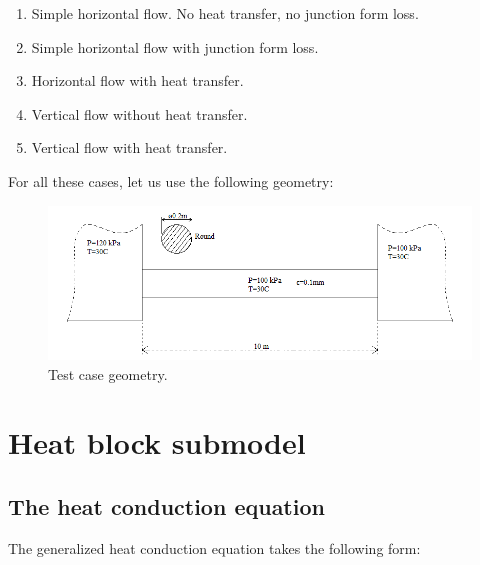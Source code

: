 \documentclass[11pt,letterpaper,titlepage]{article}
\begin{document}
\begin{enumerate}
\item Simple horizontal flow. No heat transfer, no junction form loss.
\item Simple horizontal flow with junction form loss.
\item Horizontal flow with heat transfer.
\item Vertical flow without heat transfer.
\item Vertical flow with heat transfer.
\end{enumerate}
\vspace{0.5cm}\noindent
For all these cases, let us use the following geometry:

	\begin{center}
		\begin{minipage}[c]{0.85\textwidth}
	
			\begin{figure}[H]
			
				\includegraphics[width=6in]{ZZZ_TestCase.png}
				\caption{Test case geometry.}
				\label{figure:ZZZ_TestCase}
			\end{figure}
		\end{minipage}
	\end{center}
\vspace{0.5cm}













\newpage
{}
\section{Heat block submodel}

\subsection{The heat conduction equation}
The generalized heat conduction equation takes the following form:
\end{document}
